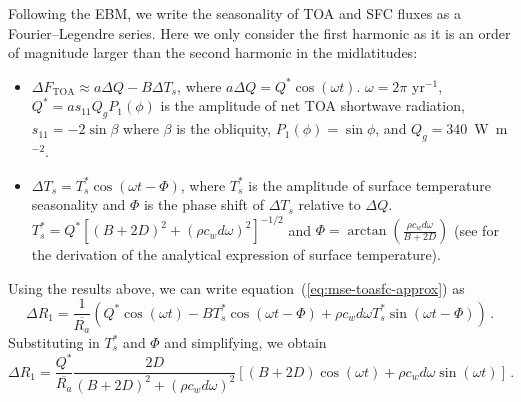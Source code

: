 \documentclass{ametsocV5}
\begin{document}
\appendix[C]
Following the \cite{rose2017} EBM, we write the seasonality of TOA and SFC fluxes as a Fourier--Legendre series. Here we only consider the first harmonic as it is an order of magnitude larger than the second harmonic in the midlatitudes:
    \begin{itemize}
      \item $\Delta F_{\mathrm{TOA}} \approx a\Delta Q - B\Delta T_{s}$, where $a\Delta Q = Q^{*}\cos(\omega t)$. $\omega=2\pi$ yr$^{-1}$, $Q^{*}=as_{11}Q_{g}P_{1}(\phi)$ is the amplitude of net TOA shortwave radiation, $s_{11}=-2\sin{\beta}$ where $\beta$ is the obliquity, $P_1(\phi) = \sin\phi$, and $Q_{g}=340$~W~m$^{-2}$. 
      \item $\Delta T_{s} = T_{s}^{*}\cos(\omega t - \Phi)$, where $T_{s}^{*}$ is the amplitude of surface temperature seasonality and $\Phi$ is the phase shift of $\Delta T_{s}$ relative to $\Delta Q$. $T_{s}^{*}=Q^{*}\left[(B+2D)^{2}+(\rho c_w d \omega)^{2}\right]^{-1/2}$ and $\Phi=\arctan\left(\frac{\rho c_w d \omega}{B+2D}\right)$ (see \cite{rose2017} for the derivation of the analytical expression of surface temperature).
    \end{itemize}
  Using the results above, we can write equation~(\ref{eq:mse-toasfc-approx}) as
  \begin{equation} \label{eq:r1-linear3}
    \Delta R_{1} = \frac{1}{\overline{R_{a}}}\left(Q^{*}\cos(\omega t) -BT_s^{*}\cos(\omega t - \Phi)+\rho c_{w} d \omega T_{s}^{*}\sin(\omega t - \Phi) \right) \, .
  \end{equation}
  Substituting in $T_{s}^{*}$ and $\Phi$ and simplifying, we obtain
  \begin{equation} \label{eq:r1-linear4-deriv}
    \Delta R_{1} = \frac{Q^{*}}{\overline{R_{a}}}\frac{2D}{(B+2D)^{2}+(\rho c_w d \omega)^{2}}\left[(B+2D)\cos(\omega t)+\rho c_w d \omega \sin(\omega t)\right] \, .
  \end{equation}



\end{document}
